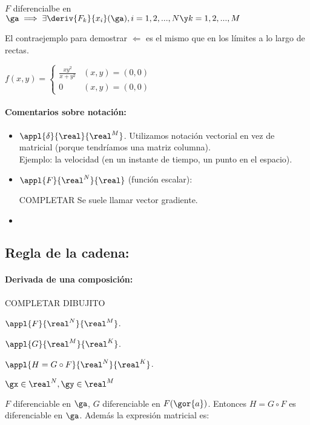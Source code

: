 \documentclass{apuntes}
\begin{document}
\begin{theorem}
 $F$ diferencialbe en $\ga \implies \exists \deriv{F_k}{x_i}(\ga), i=1,2,...,N \y k = 1,2,...,M$
\end{theorem}

El contraejemplo para demostrar $\Leftarrow$ es el mismo que en los límites a lo largo de rectas.

$f(x,y) = \left\{ \begin{matrix}

\frac{xy^2}{x+y^2} & (x,y) = (0,0) \\ 
0 & (x,y)=(0,0)
           
          \end{matrix}\right.
$
\paragraph{Comentarios sobre notación: }
\begin{itemize}
 \item $\appl{\delta}{\real}{\real^M}$. Utilizamos notación vectorial en vez de matricial (porque tendríamos una matriz columna).\\
 Ejemplo: la velocidad (en un instante de tiempo, un punto en el espacio).
 \item $\appl{F}{\real^N}{\real}$ (función escalar):

 COMPLETAR
 Se suele llamar vector gradiente.
 \item 
\end{itemize}

\subsection{Regla de la cadena: }
\paragraph{Derivada de una composición:\\}

COMPLETAR DIBUJITO

$\appl{F}{\real^N}{\real^M}$. 

$\appl{G}{\real^M}{\real^K}$.

$\appl{H=G\circ F}{\real^N}{\real^K}$.

$ \gx \in \real^N, \gy \in \real^M$

$F$ diferenciable en $\ga$, $G$ diferenciable en $F(\gor{a})$. Entonces $H=G\circ F$ es diferenciable en $\ga $.
Además la expresión matricial es:
\end{document}
